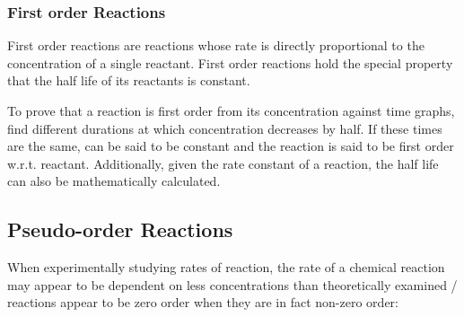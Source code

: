 \documentclass[../main]{subfiles}
\begin{document}


	\subsubsection{First order Reactions}

	First order reactions are reactions whose rate is directly proportional to the concentration of a single reactant. First order reactions hold the special property that the half life of its reactants is constant.


	To prove that a reaction is first order from its concentration against time graphs, find different durations at which concentration decreases by half. If these times are the same,  can be said to be constant and the reaction is said to be first order w.r.t. reactant. Additionally, given the rate constant of a reaction, the half life can also be mathematically calculated.


	\subsection{Pseudo-order Reactions}

	When experimentally studying rates of reaction, the rate of a chemical reaction may appear to be dependent on less concentrations than theoretically examined / reactions appear to be zero order when they are in fact non-zero order:
\end{document}

